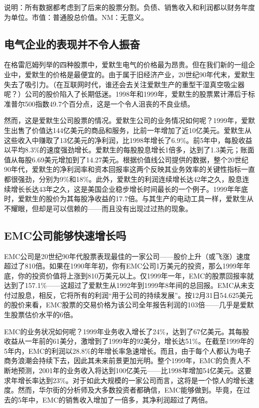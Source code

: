 \documentclass[12pt,oneside]{book}
\begin{document}
说明：所有数据都考虑到了后来的股票分割。负债、销售收入和利润都以财务年度为单位。市值：普通股总价值。NM：无意义。

\subsection{电气企业的表现并不令人振奋}
在格雷厄姆列举的四种股票中，爱默生电气的价格最为昂贵。但在我们新的一组企业中，爱默生的价格是最便宜的。由于属于旧经济产业，20世纪90年代末，爱默生失去了吸引力。（在互联网时代，谁还会去关注爱默生产的重型干湿真空吸尘器呢？）公司的股价陷入了长期低迷。1998年和1999年，爱默生的股票累计滞后于标准普尔500指数49.7个百分点，这是一个令人沮丧的不良业绩。

然而，这是爱默生公司股票的情况。爱默生公司的业务情况如何呢？1999年，爱默生出售了价值达144亿美元的商品和服务，比前一年增加了近10亿美元。爱默生从这些收入中赚取了13亿美元的净利润，比1998年增长了6.9\%。前5年中，每股收益以平均8.3\%的速度强劲增长。爱默生的每股股息增长1倍多，达到了1.3美元；账面值从每股6.69美元增加到了14.27美元。根据价值线公司提供的数据，整个20世纪90年代，爱默生的净利润率和资本回报率这两个反映其业务效率的关键性指标一直都很强劲，分别为9\%和18\%。此外，爱默生的利润连续增长达42年之久，股息连续增长长达43年之久，这是美国企业稳步增长时间最长的一个例子。1999年年底时，爱默生的股价为其每股净收益的17.7倍。与其生产的电动工具一样，爱默生从不耀眼，但却是可以信赖的——而且没有出现过过热的现象。

\subsection{EMC公司能够快速增长吗}
EMC公司是20世纪90年代股票表现最佳的一家公司——股价上升（或飞涨）速度超过了810倍。如果在1990年年初，你有EMC公司1万美元的投资，那么1999年年底，你的投资价值将上涨到810万美元以上。仅1999年一年，EMC的股票回报率就达到了157.1\%——这超过了爱默生从1992年到1999年8年间的总回报。EMC从未支付过股息，相反，它将所有的利润“用于公司的持续发展”。按12月31日54.625美元的股价来看，EMC股票的交易价格为该公司全年报告利润的103倍——几乎是爱默生股票估价水平的6倍。

EMC的业务状况如何呢？1999年业务收入增长了24\%，达到了67亿美元。其每股收益从一年前的61美分，激增到了1999年的92美分，增长达51\%。在截至1999年的5年内，EMC的利润以28.8\%的年增长率急速增长。而且，由于每个人都认为电子商务浪潮会持续下去，因此其未来前景更加光明。整个1999年，EMC的负责人不断地预测，2001年的业务收入将达到100亿美元——比1998年增加54亿美元。这要求年增长率达到23\%。对于如此大规模的一家公司而言，这将是一个惊人的增长速度。然而，华尔街的分析师及大多数投资者都确信，EMC能够做到。毕竟，在过去的5年中，EMC的销售收入增加了一倍多，其净利润超过了两倍。
\end{document}

